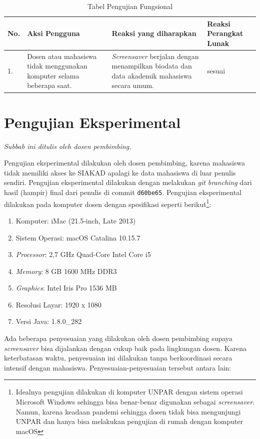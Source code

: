 \begin{table}[H]
	\centering
	\caption{Tabel Pengujian Fungsional}
	\begin{tabular}{|p{0.5cm}| p{5.5cm}| p{5.5cm}| p{3cm}|} \hline
	No.	&	Aksi Pengguna	&	Reaksi yang diharapkan	&	Reaksi Perangkat Lunak \\ \hline
	1.	&	Dosen atau mahasiswa tidak menggunakan komputer selama beberapa saat. 	&	\textit{Screensaver} berjalan dengan menampilkan biodata dan data akademik mahasiswa secara umum.	&	sesuai	\\ \hline
	\end{tabular}
	\label{table:hasilFungsional}
\end{table}


\section{Pengujian Eksperimental}

\textit{Subbab ini ditulis oleh dosen pembimbing.}

Pengujian eksperimental dilakukan oleh dosen pembimbing, karena mahasiswa tidak memiliki akses ke SIAKAD apalagi ke data mahasiswa di luar penulis sendiri. Pengujian eksperimental dilakukan dengan melakukan \textit{git branching} dari hasil (hampir) final dari penulis di commit \texttt{d60be65}. Pengujian eksperimental dilakukan pada komputer dosen dengan spesifikasi seperti berikut\footnote{Idealnya pengujian dilakukan di komputer UNPAR dengan sistem operasi Microsoft Windows sehingga bisa benar-benar digunakan sebagai \textit{screensaver}. Namun, karena keadaan pandemi sehingga dosen tidak bisa mengunjungi UNPAR dan hanya bisa melakukan pengujian di rumah dengan komputer macOS}:

\begin{enumerate}
	\item Komputer: iMac (21.5-inch, Late 2013)
    \item Sistem Operasi: macOS Catalina 10.15.7
    \item \textit{Processor}: 2,7 GHz Quad-Core Intel Core i5
    \item \textit{Memory}: 8 GB 1600 MHz DDR3
    \item \textit{Graphics}: Intel Iris Pro 1536 MB
    \item Resolusi Layar: 1920 x 1080
    \item Versi Java: 1.8.0\_282
\end{enumerate}

Ada beberapa penyesuaian yang dilakukan oleh dosen pembimbing supaya \textit{screensaver} bisa dijalankan dengan cukup baik pada lingkungan dosen. Karena keterbatasan waktu, penyesuaian ini dilakukan tanpa berkoordinasi secara intensif dengan mahasiswa. Penyesuaian-penyesuaian tersebut antara lain:


